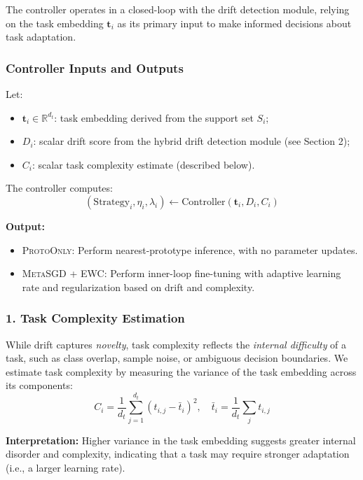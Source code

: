 \documentclass[conference]{IEEEtran}
\begin{document}
The controller operates in a closed-loop with the drift detection module, relying on the task embedding $\mathbf{t}_i$ as its primary input to make informed decisions about task adaptation.

\subsubsection*{Controller Inputs and Outputs}

Let:
\begin{itemize}
    \item $\mathbf{t}_i \in \mathbb{R}^{d_t}$: task embedding derived from the support set $S_i$;
    \item $D_i$: scalar drift score from the hybrid drift detection module (see Section 2);
    \item $C_i$: scalar task complexity estimate (described below).
\end{itemize}

The controller computes:
\[
(\text{Strategy}_i, \eta_i, \lambda_i) \gets \text{Controller}(\mathbf{t}_i, D_i, C_i)
\]

\textbf{Output:}
\begin{itemize}
    \item \textsc{ProtoOnly}: Perform nearest-prototype inference, with no parameter updates.
    \item \textsc{MetaSGD + EWC}: Perform inner-loop fine-tuning with adaptive learning rate and regularization based on drift and complexity.
\end{itemize}

\subsubsection*{1. Task Complexity Estimation}

While drift captures \emph{novelty}, task complexity reflects the \emph{internal difficulty} of a task, such as class overlap, sample noise, or ambiguous decision boundaries. We estimate task complexity by measuring the variance of the task embedding across its components:
\begin{equation}
    C_i = \frac{1}{d_t} \sum_{j=1}^{d_t} (t_{i,j} - \bar{t}_i)^2, \quad \bar{t}_i = \frac{1}{d_t} \sum_j t_{i,j}
\end{equation}

\textbf{Interpretation:} Higher variance in the task embedding suggests greater internal disorder and complexity, indicating that a task may require stronger adaptation (i.e., a larger learning rate).
\end{document}
